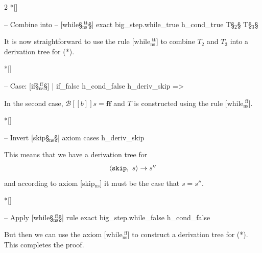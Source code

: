\begin{paracol}{2}
\switchcolumn[1]*[]
\begin{leftcolumn}
    \begin{Lean_Code}
      -- Combine into
      -- [while§\color{green!40!black}$_{\text{ns}}^{\text{\ tt}}$§]
      exact big_step.while_true
        h_cond_true
        T§$_2$§ T§$_3$§
    \end{Lean_Code}
\end{leftcolumn}
\begin{rightcolumn} \noindent
It is now straightforward to use the rule [while$_{\text{ns}}^{\text{\ tt}}$] to combine
\(T _2\) and \(T_3\) into a derivation tree for (*).
\end{rightcolumn}
\vspace{1.5em}

\switchcolumn[1]*[]
\begin{leftcolumn}
    \begin{Lean_Code}
  -- Case: [if§\color{green!40!black}$_{\text{ns}}^{\ \text{ff}}$§]
  | if_false
    h_cond_false
    h_deriv_skip =>
    \end{Lean_Code}
\end{leftcolumn}

\begin{rightcolumn} \noindent
In the second case, \(\mathcal{B}[\![b]\!]s = \mathbf{ff}\) and \(T\) is constructed using the rule [while$_{\text{ns}}^{\text{\ ff}}$].
\end{rightcolumn}
\vspace{1.5em}

\switchcolumn[1]*[]
\begin{leftcolumn}
    \begin{Lean_Code}
    -- Invert [skip§\color{green!40!black}$_{\text{ns}}$§] axiom
    cases h_deriv_skip
    \end{Lean_Code}
\end{leftcolumn}

\begin{rightcolumn} \noindent
This means that we have a derivation tree for
\[
    \begin{prooftree}
        \hypo{\langle \mathtt{skip},\ s\rangle \to s''}
    \end{prooftree}
\]
and according to axiom [skip$_{\text{ns}}$] it must be the case that \(s = s''\).
\end{rightcolumn}
\vspace{3.5em}

\switchcolumn[1]*[]
\begin{leftcolumn}
    \begin{Lean_Code}
    -- Apply [while§\color{green!40!black}$_{\text{ns}}^{\text{\ ff}}$§] rule
    exact big_step.while_false
      h_cond_false
    \end{Lean_Code}
\end{leftcolumn}


\begin{rightcolumn} \noindent
But then we can use the axiom [while$_{\text{ns}}^{\text{\ ff}}$] to construct a derivation tree for (*).
This completes the proof.
\end{rightcolumn}
\vspace{1.5em}

\end{paracol} 

